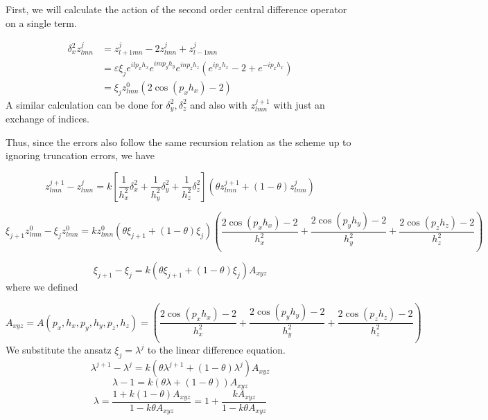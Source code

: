 \documentclass{article}
\numberwithin{equation}{section}
\theoremstyle{definition}
\newcommand{\eps}{\varepsilon}
\begin{document}
First, we will calculate the action of the second order central difference operator on a single term.

\begin{align}
    \delta_x^2 z_{lmn}^{j} &= z_{l+1 mn}^{j} - 2z_{lmn}^{j} + z_{l-1 mn}^{j} \\
    &= \eps \xi_j e^{ilp_x h_x}e^{imp_y h_y}e^{inp_z h_z} (e^{ip_x h_x} - 2 + e^{-ip_x h_x}) \\
    &= \xi_j z_{lmn}^0 (2\cos(p_x h_x)-2)
\end{align}
A similar calculation can be done for $\delta_y^2, \delta_z^2$ and also with $z_{lmn}^{j+1}$ with just an exchange of indices.

Thus, since the errors also follow the same recursion relation as the scheme up to ignoring truncation errors, we have

\begin{equation}
    z_{lmn}^{j+1} - z_{lmn}^j = k \left[
        \frac{1}{h_x^2}\delta_x^2 + 
        \frac{1}{h_y^2}\delta_y^2 + 
        \frac{1}{h_z^2}\delta_z^2
    \right]
    \left(
        \theta z_{lmn}^{j+1} + (1-\theta)z_{lmn}^j
    \right)
\end{equation}

\begin{equation}
    \xi_{j+1}z_{lmn}^0 - \xi_j z_{lmn}^0 = k z_{lmn}^0
        \left(\theta \xi_{j+1} + (1- \theta) \xi_j\right) \left(
            \frac{2\cos(p_x h_x)-2}{h_x^2} +
            \frac{2\cos(p_y h_y)-2}{h_y^2} +
            \frac{2\cos(p_z h_z)-2}{h_z^2}
        \right)
\end{equation}
    
\begin{equation}
    \xi_{j+1} - \xi_j  = k
        \left(\theta \xi_{j+1} + (1- \theta) \xi_j\right)A_{xyz}
\end{equation}
where we defined

\begin{equation}
    A_{xyz} = A(p_x, h_x, p_y, h_y, p_z, h_z) = \left(
    \frac{2\cos(p_x h_x)-2}{h_x^2} +
    \frac{2\cos(p_y h_y)-2}{h_y^2} +
    \frac{2\cos(p_z h_z)-2}{h_z^2}
\right)
\end{equation}
We substitute the ansatz $\xi_j = \lambda^j$ to the linear difference equation.
\begin{equation}
    \lambda^{j+1} - \lambda^j  = k
        \left(\theta \lambda^{j+1} + (1- \theta) \lambda^j\right)A_{xyz}
\end{equation}
\begin{equation}
    \lambda - 1  = k
        \left(\theta \lambda + (1- \theta) \right)A_{xyz}
\end{equation}
\begin{equation}
    \lambda = \frac{1 + k(1- \theta)A_{xyz}}{1 - k \theta  A_{xyz}} = 1 + \frac{kA_{xyz}}{1 - k \theta  A_{xyz}}
\end{equation}
\end{document}

